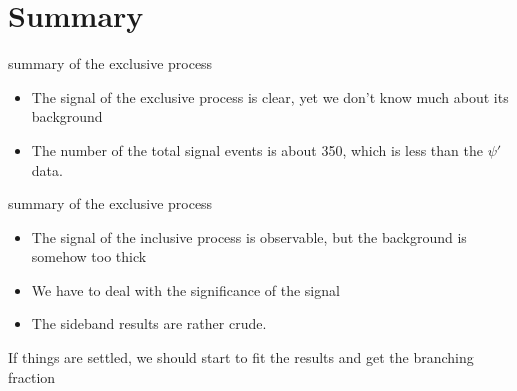 \documentclass{beamer}
\begin{document}
\section{Summary}
\begin{frame}
\begin{block}{summary of the exclusive process}
\begin{itemize}
\item The signal of the exclusive process is clear, yet we don't know much about its background
\item The number of the total signal events is about 350, which is less than the $\psi\prime$ data.
\end{itemize}
\end{block}
\begin{block}{summary of the exclusive process}
\begin{itemize}
\item The signal of the inclusive process is observable, but the background is somehow too thick
\item We have to deal with the significance of the signal
\item The sideband results are rather crude.
\end{itemize}
\end{block}
\bigskip
If things are settled, we should start to fit the results and get the branching fraction
\end{frame}
\end{document}
